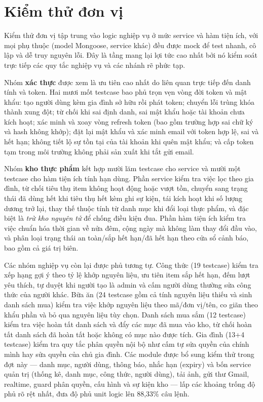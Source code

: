 \documentclass[12pt,a4paper]{article}
\begin{document}
\section{Kiểm thử đơn vị}

Kiểm thử đơn vị tập trung vào logic nghiệp vụ ở mức service và hàm tiện ích, với mọi phụ thuộc (model
Mongoose, service khác) đều được mock để test nhanh, cô lập và dễ truy nguyên lỗi. Đây là tầng mang lại lợi
tức cao nhất bởi nó kiểm soát trực tiếp các quy tắc nghiệp vụ và các nhánh rẽ phức tạp.

Nhóm \textbf{xác thực} được xem là ưu tiên cao nhất do liên quan trực tiếp đến danh tính và token. Hai mươi
mốt testcase bao phủ trọn vẹn vòng đời token và mật khẩu: tạo người dùng kèm gia đình sở hữu rồi phát token;
chuyển lỗi trùng khóa thành xung đột; từ chối khi sai định danh, sai mật khẩu hoặc tài khoản chưa kích hoạt;
xác minh và xoay vòng refresh token (bao gồm trường hợp sai chữ ký và hash không khớp); đặt lại mật khẩu và
xác minh email với token hợp lệ, sai và hết hạn; không tiết lộ sự tồn tại của tài khoản khi quên mật khẩu;
và cấp token tạm trong môi trường không phải sản xuất khi tắt gửi email.

Nhóm \textbf{kho thực phẩm} kết hợp mười lăm testcase cho service và mười một testcase cho hàm tiện ích tính
hạn dùng. Phần service kiểm tra việc lọc theo gia đình, từ chối tiêu thụ item không hoạt động hoặc vượt tồn,
chuyển sang trạng thái đã dùng hết khi tiêu thụ hết kèm ghi sự kiện, tái kích hoạt khi số lượng dương trở
lại, thay thế thuộc tính từ danh mục khi đổi loại thực phẩm, và đặc biệt là \emph{trừ kho nguyên tử} để
chống điều kiện đua. Phần hàm tiện ích kiểm tra việc chuẩn hóa thời gian
về nửa đêm, cộng ngày mà không làm thay đổi đầu vào, và phân loại trạng thái an toàn/sắp hết hạn/đã hết hạn
theo cửa sổ cảnh báo, bao gồm cả giá trị biên.

Các nhóm nghiệp vụ còn lại được phủ tương tự. Công thức (19 testcase) kiểm tra xếp hạng gợi ý theo tỷ lệ
khớp nguyên liệu, ưu tiên item sắp hết hạn, đếm lượt yêu thích, tự duyệt khi người tạo là admin và cấm người
dùng thường sửa công thức của người khác. Bữa ăn (24 testcase gồm cả tính nguyên liệu thiếu và sinh danh
sách mua) kiểm tra việc khớp nguyên liệu theo mã/đơn vị/tên, co giãn theo khẩu phần và bỏ qua nguyên liệu
tùy chọn. Danh sách mua sắm (12 testcase) kiểm tra việc hoàn tất danh sách và đẩy các mục đã mua vào kho, từ
chối hoàn tất danh sách đã hoàn tất hoặc không có mục nào được tích. Gia đình (13+4 testcase) kiểm tra quy
tắc phân quyền nội bộ như cấm tự sửa quyền của chính mình hay sửa quyền của chủ gia đình. Các module được bổ
sung kiểm thử trong đợt này --- danh mục, người dùng, thông báo, nhắc hạn (expiry) và bốn service quản trị
(thống kê, danh mục, công thức, người dùng), tải ảnh, gửi thư Gmail, realtime, guard phân quyền, cấu hình và
sự kiện kho --- lấp các khoảng trống độ phủ rõ rệt nhất, đưa độ phủ unit logic lên 88,33\% câu lệnh.
\end{document}
